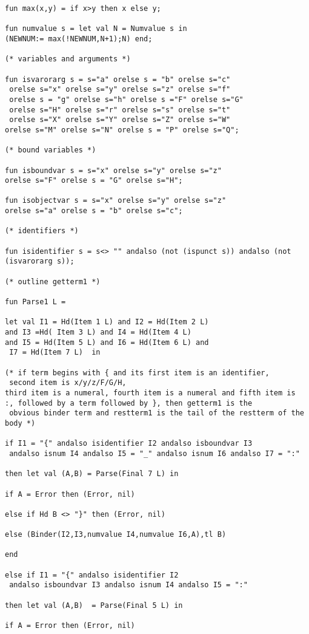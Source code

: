 \documentclass{article}
\begin{document}
{{\begin{verbatim}
fun max(x,y) = if x>y then x else y;

fun numvalue s = let val N = Numvalue s in
(NEWNUM:= max(!NEWNUM,N+1);N) end;

(* variables and arguments *)

fun isvarorarg s = s="a" orelse s = "b" orelse s="c"
 orelse s="x" orelse s="y" orelse s="z" orelse s="f"
 orelse s = "g" orelse s="h" orelse s ="F" orelse s="G"
 orelse s="H" orelse s="r" orelse s="s" orelse s="t"
 orelse s="X" orelse s="Y" orelse s="Z" orelse s="W"
orelse s="M" orelse s="N" orelse s = "P" orelse s="Q";

(* bound variables *)

fun isboundvar s = s="x" orelse s="y" orelse s="z" 
orelse s="F" orelse s = "G" orelse s="H";

fun isobjectvar s = s="x" orelse s="y" orelse s="z" 
orelse s="a" orelse s = "b" orelse s="c";

(* identifiers *)

fun isidentifier s = s<> "" andalso (not (ispunct s)) andalso (not (isvarorarg s));

(* outline getterm1 *)

fun Parse1 L =

let val I1 = Hd(Item 1 L) and I2 = Hd(Item 2 L) 
and I3 =Hd( Item 3 L) and I4 = Hd(Item 4 L) 
and I5 = Hd(Item 5 L) and I6 = Hd(Item 6 L) and
 I7 = Hd(Item 7 L)  in

(* if term begins with { and its first item is an identifier,
 second item is x/y/z/F/G/H, 
third item is a numeral, fourth item is a numeral and fifth item is
:, followed by a term followed by }, then getterm1 is the
 obvious binder term and restterm1 is the tail of the restterm of the body *)

if I1 = "{" andalso isidentifier I2 andalso isboundvar I3
 andalso isnum I4 andalso I5 = "_" andalso isnum I6 andalso I7 = ":"

then let val (A,B) = Parse(Final 7 L) in 

if A = Error then (Error, nil)

else if Hd B <> "}" then (Error, nil)

else (Binder(I2,I3,numvalue I4,numvalue I6,A),tl B)

end 

else if I1 = "{" andalso isidentifier I2
 andalso isboundvar I3 andalso isnum I4 andalso I5 = ":"

then let val (A,B)  = Parse(Final 5 L) in

if A = Error then (Error, nil)


\end{verbatim}}}
\end{document}

